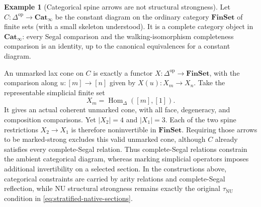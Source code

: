 \documentclass[oneside]{article}
\theoremstyle{plain}
\theoremstyle{definition}
\newtheorem{example}[theorem]{Example}
\theoremstyle{remark}
\newcommand{\Cat}{\mathbf{Cat}_{\infty}}
\newcommand{\NU}{\mathrm{NU}}
\newcommand{\op}{\mathrm{op}}
\begin{document}
\begin{example}[Categorical spine arrows are not structural strongness]
\label{ex:stratified-spine-strongness}
Let $C:\Delta^{\op}\to\Cat$ be the constant diagram on the
ordinary category $\mathbf{FinSet}$ of finite sets (with a small
skeleton understood).  It is a complete
category object in $\Cat$: every Segal comparison and the
walking-isomorphism completeness comparison is an identity, up to the
canonical equivalences for a constant diagram.

An unmarked lax cone on $C$ is exactly a functor
$X:\Delta^{\op}\to\mathbf{FinSet}$, with the comparison along
$u:[m]\to[n]$ given by $X(u):X_m\to X_n$.  Take the representable
simplicial finite set
\[
 X_m=\operatorname{Hom}_{\Delta}([m],[1]).
\]
It gives an actual coherent unmarked cone, with all face, degeneracy,
and composition comparisons.  Yet $|X_2|=4$ and $|X_1|=3$.
Each of the two spine restrictions $X_2\to X_1$ is therefore
noninvertible in $\mathbf{FinSet}$.  Requiring those arrows to be
marked-strong excludes this valid unmarked cone, although $C$ already
satisfies every complete-Segal relation.  Thus complete-Segal
relations constrain the ambient categorical diagram, whereas marking
simplicial operators imposes additional invertibility on a selected
section.  In the constructions above, categorical constraints are
carried by arity relations and complete-Segal reflection, while NU
structural strongness remains exactly the original $\tau_{\NU}$
condition in \eqref{eq:stratified-native-sections}.
\end{example}
\end{document}
